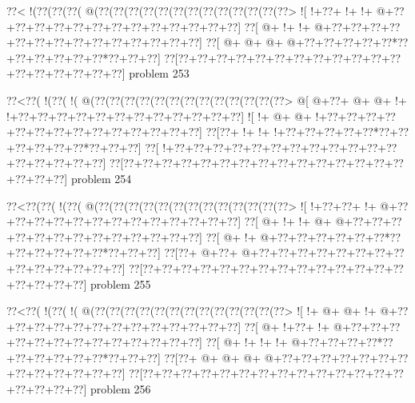 \vbox{\vbox{\goo
\0??<\- !(\0??(\0??(\0??(\- @(\0??(\0??(\0??(\0??(\0??(\0??(\0??(\0??(\0??(\0??(\0??(\0??(\0??>
\- ![\- !+\0??+\- !+\- !+\- @+\0??+\0??+\0??+\0??+\0??+\0??+\0??+\0??+\0??+\0??+\0??+\0??+\0??]
\0??[\- @+\- !+\- !+\- @+\0??+\0??+\0??+\0??+\0??+\0??+\0??+\0??+\0??+\0??+\0??+\0??+\0??+\0??]
\0??[\- @+\- @+\- @+\- @+\0??+\0??+\0??+\0??+\0??*\0??+\0??+\0??+\0??+\0??+\0??*\0??+\0??+\0??]
\0??[\0??+\0??+\0??+\0??+\0??+\0??+\0??+\0??+\0??+\0??+\0??+\0??+\0??+\0??+\0??+\0??+\0??+\0??]
}
\hfil problem 253\hfil\break
}



\vbox{\vbox{\goo
\0??<\0??(\- !(\0??(\- !(\- @(\0??(\0??(\0??(\0??(\0??(\0??(\0??(\0??(\0??(\0??(\0??(\0??(\0??>
\- @[\- @+\0??+\- @+\- @+\- !+\- !+\0??+\0??+\0??+\0??+\0??+\0??+\0??+\0??+\0??+\0??+\0??+\0??]
\- ![\- !+\- @+\- @+\- !+\0??+\0??+\0??+\0??+\0??+\0??+\0??+\0??+\0??+\0??+\0??+\0??+\0??+\0??]
\0??[\0??+\- !+\- !+\- !+\0??+\0??+\0??+\0??+\0??*\0??+\0??+\0??+\0??+\0??+\0??*\0??+\0??+\0??]
\0??[\- !+\0??+\0??+\0??+\0??+\0??+\0??+\0??+\0??+\0??+\0??+\0??+\0??+\0??+\0??+\0??+\0??+\0??]
\0??[\0??+\0??+\0??+\0??+\0??+\0??+\0??+\0??+\0??+\0??+\0??+\0??+\0??+\0??+\0??+\0??+\0??+\0??]
}
\hfil problem 254\hfil\break
}



\vbox{\vbox{\goo
\0??<\0??(\0??(\- !(\0??(\- @(\0??(\0??(\0??(\0??(\0??(\0??(\0??(\0??(\0??(\0??(\0??(\0??(\0??>
\- ![\- !+\0??+\0??+\- !+\- @+\0??+\0??+\0??+\0??+\0??+\0??+\0??+\0??+\0??+\0??+\0??+\0??+\0??]
\0??[\- @+\- !+\- !+\- @+\- @+\0??+\0??+\0??+\0??+\0??+\0??+\0??+\0??+\0??+\0??+\0??+\0??+\0??]
\0??[\- @+\- !+\- @+\0??+\0??+\0??+\0??+\0??+\0??*\0??+\0??+\0??+\0??+\0??+\0??*\0??+\0??+\0??]
\0??[\0??+\- @+\0??+\- @+\0??+\0??+\0??+\0??+\0??+\0??+\0??+\0??+\0??+\0??+\0??+\0??+\0??+\0??]
\0??[\0??+\0??+\0??+\0??+\0??+\0??+\0??+\0??+\0??+\0??+\0??+\0??+\0??+\0??+\0??+\0??+\0??+\0??]
}
\hfil problem 255\hfil\break
}



\vbox{\vbox{\goo
\0??<\0??(\- !(\0??(\- !(\- @(\0??(\0??(\0??(\0??(\0??(\0??(\0??(\0??(\0??(\0??(\0??(\0??(\0??>
\- ![\- !+\- @+\- @+\- !+\- @+\0??+\0??+\0??+\0??+\0??+\0??+\0??+\0??+\0??+\0??+\0??+\0??+\0??]
\0??[\- @+\- !+\0??+\- !+\- @+\0??+\0??+\0??+\0??+\0??+\0??+\0??+\0??+\0??+\0??+\0??+\0??+\0??]
\0??[\- @+\- !+\- !+\- !+\- @+\0??+\0??+\0??+\0??*\0??+\0??+\0??+\0??+\0??+\0??*\0??+\0??+\0??]
\0??[\0??+\- @+\- @+\- @+\- @+\0??+\0??+\0??+\0??+\0??+\0??+\0??+\0??+\0??+\0??+\0??+\0??+\0??]
\0??[\0??+\0??+\0??+\0??+\0??+\0??+\0??+\0??+\0??+\0??+\0??+\0??+\0??+\0??+\0??+\0??+\0??+\0??]
}
\hfil problem 256\hfil\break
}




